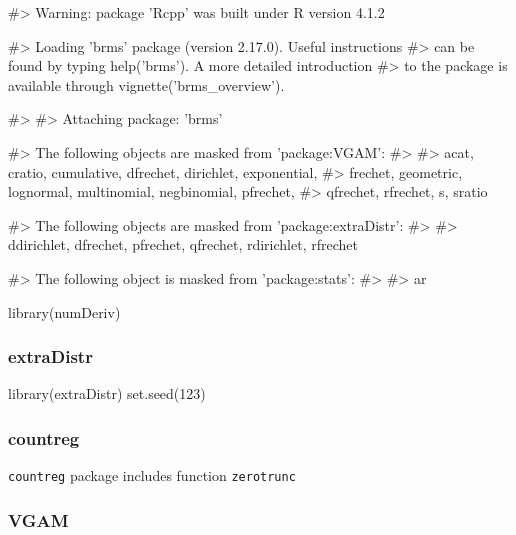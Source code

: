 \begin{Schunk}
\begin{Soutput}
#> Warning: package 'Rcpp' was built under R version 4.1.2
\end{Soutput}
\begin{Soutput}
#> Loading 'brms' package (version 2.17.0). Useful instructions
#> can be found by typing help('brms'). A more detailed introduction
#> to the package is available through vignette('brms_overview').
\end{Soutput}
\begin{Soutput}
#> 
#> Attaching package: 'brms'
\end{Soutput}
\begin{Soutput}
#> The following objects are masked from 'package:VGAM':
#> 
#>     acat, cratio, cumulative, dfrechet, dirichlet, exponential,
#>     frechet, geometric, lognormal, multinomial, negbinomial, pfrechet,
#>     qfrechet, rfrechet, s, sratio
\end{Soutput}
\begin{Soutput}
#> The following objects are masked from 'package:extraDistr':
#> 
#>     ddirichlet, dfrechet, pfrechet, qfrechet, rdirichlet, rfrechet
\end{Soutput}
\begin{Soutput}
#> The following object is masked from 'package:stats':
#> 
#>     ar
\end{Soutput}
\begin{Sinput}
library(numDeriv)
\end{Sinput}
\end{Schunk}

\hypertarget{extradistr}{%
\subsubsection{extraDistr}\label{extradistr}}

\begin{Schunk}
\begin{Sinput}
library(extraDistr)
set.seed(123)
\end{Sinput}
\end{Schunk}

\hypertarget{countreg}{%
\subsubsection{countreg}\label{countreg}}

\texttt{countreg} package includes function \texttt{zerotrunc}

\hypertarget{vgam}{%
\subsubsection{VGAM}\label{vgam}}

